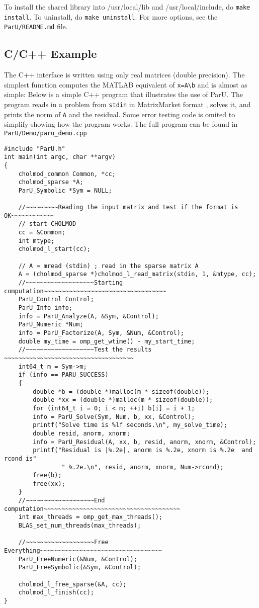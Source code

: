 \documentclass[12pt]{article}
\begin{document}
To install the shared library
into /usr/local/lib and /usr/local/include, do {\tt make install}.
To uninstall, do {\tt make uninstall}.
For more options, see the {\tt ParU/README.md} file.



\subsection{C/C++ Example}

The C++ interface is written using only real matrices (double precision).  
The simplest function computes the MATLAB equivalent of
\verb'x=A\b' and is almost as simple:
Below is a simple C++ program that illustrates the use of ParU.  The
program reads in a problem from \verb'stdin' in MatrixMarket
format \cite{BoisvertPozoRemingtonBarrettDongarra97}, solves it, and prints the
norm of \verb'A' and the residual. 
Some error testing code is omited to simplify showing how the program works. 
The full program can be found in 
\verb'ParU/Demo/paru_demo.cpp'
\begin{verbatim}
#include "ParU.h"
int main(int argc, char **argv)
{
    cholmod_common Common, *cc;
    cholmod_sparse *A;
    ParU_Symbolic *Sym = NULL;

    //~~~~~~~~~Reading the input matrix and test if the format is OK~~~~~~~~~~~~
    // start CHOLMOD
    cc = &Common;
    int mtype;
    cholmod_l_start(cc);

    // A = mread (stdin) ; read in the sparse matrix A
    A = (cholmod_sparse *)cholmod_l_read_matrix(stdin, 1, &mtype, cc);
    //~~~~~~~~~~~~~~~~~~~Starting computation~~~~~~~~~~~~~~~~~~~~~~~~~~~~~~~~~~
    ParU_Control Control;
    ParU_Info info;
    info = ParU_Analyze(A, &Sym, &Control);
    ParU_Numeric *Num;
    info = ParU_Factorize(A, Sym, &Num, &Control);
    double my_time = omp_get_wtime() - my_start_time;
    //~~~~~~~~~~~~~~~~~~~Test the results ~~~~~~~~~~~~~~~~~~~~~~~~~~~~~~~~~~~~
    int64_t m = Sym->m;
    if (info == PARU_SUCCESS)
    {
        double *b = (double *)malloc(m * sizeof(double));
        double *xx = (double *)malloc(m * sizeof(double));
        for (int64_t i = 0; i < m; ++i) b[i] = i + 1;
        info = ParU_Solve(Sym, Num, b, xx, &Control);
        printf("Solve time is %lf seconds.\n", my_solve_time);
        double resid, anorm, xnorm;
        info = ParU_Residual(A, xx, b, resid, anorm, xnorm, &Control);
        printf("Residual is |%.2e|, anorm is %.2e, xnorm is %.2e  and rcond is"
                " %.2e.\n", resid, anorm, xnorm, Num->rcond);
        free(b);
        free(xx);
    }
    //~~~~~~~~~~~~~~~~~~~End computation~~~~~~~~~~~~~~~~~~~~~~~~~~~~~~~~~~~~~~
    int max_threads = omp_get_max_threads();
    BLAS_set_num_threads(max_threads);

    //~~~~~~~~~~~~~~~~~~~Free Everything~~~~~~~~~~~~~~~~~~~~~~~~~~~~~~~~~~
    ParU_FreeNumeric(&Num, &Control);
    ParU_FreeSymbolic(&Sym, &Control);

    cholmod_l_free_sparse(&A, cc);
    cholmod_l_finish(cc);
}
\end{verbatim}
\end{document}
